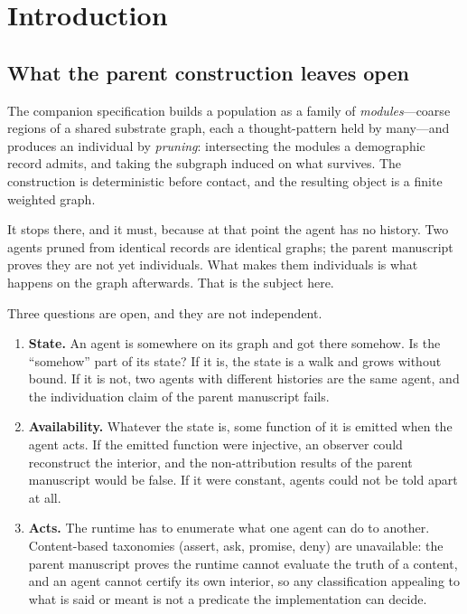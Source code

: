 \documentclass[11pt,a4paper]{article}
\theoremstyle{clstyle}
\theoremstyle{definition}
\theoremstyle{remark}
\newcommand{\rec}{m}
\newcommand{\term}{v}                    %
\begin{document}
\begin{abstract}
We close by fixing the correspondence between the discrete pair
$(\term,\rec)$ and a continuous gradient flow on a bounded coordinate box,
showing the two descriptions agree on the attracting set, and stating
precisely which quantities of the continuous theory are \emph{not}
observables of the instrument. Nine implementation invariants follow, each
a decidable predicate on the runtime.
\end{abstract}

\tableofcontents

\section{Introduction}

\subsection{What the parent construction leaves open}

The companion specification builds a population as a family of
\emph{modules}---coarse regions of a shared substrate graph, each a
thought-pattern held by many---and produces an individual by \emph{pruning}:
intersecting the modules a demographic record admits, and taking the
subgraph induced on what survives. The construction is deterministic before
contact, and the resulting object is a finite weighted graph.

It stops there, and it must, because at that point the agent has no history.
Two agents pruned from identical records are identical graphs; the parent
manuscript proves they are not yet individuals. What makes them individuals
is what happens on the graph afterwards. That is the subject here.

Three questions are open, and they are not independent.

\begin{enumerate}[label=(\alph*),leftmargin=2em]
\item \textbf{State.} An agent is somewhere on its graph and got there
somehow. Is the ``somehow'' part of its state? If it is, the state is a walk
and grows without bound. If it is not, two agents with different histories
are the same agent, and the individuation claim of the parent manuscript
fails.
\item \textbf{Availability.} Whatever the state is, some function of it is
emitted when the agent acts. If the emitted function were injective, an
observer could reconstruct the interior, and the non-attribution results of
the parent manuscript would be false. If it were constant, agents could not
be told apart at all.
\item \textbf{Acts.} The runtime has to enumerate what one agent can do to
another. Content-based taxonomies (assert, ask, promise, deny) are
unavailable: the parent manuscript proves the runtime cannot evaluate the
truth of a content, and an agent cannot certify its own interior, so any
classification appealing to what is said or meant is not a predicate the
implementation can decide.
\end{enumerate}
\end{document}
